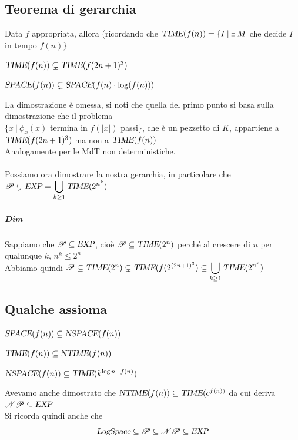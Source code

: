 \documentclass[10pt]{book}
\begin{document}
\subsection{Teorema di gerarchia}
Data $f$ appropriata, allora (ricordando che $\textsl{TIME}(f(n))=\{I\:|\:\exists\:M$ che decide $I$ in tempo $f(n)\}$
\begin{list}{}{}
	\item $\textsl{TIME}(f(n))\subsetneq\textsl{TIME}(f(2n + 1)^3)$
	\item $\textsl{SPACE}(f(n))\subsetneq\textsl{SPACE}(f(n)\cdot\log(f(n)))$
\end{list}
La dimostrazione è omessa, si noti che quella del primo punto si basa sulla dimostrazione che il problema\\$\{x\:|\:\phi_x(x)$ termina in $f(|x|)$ passi$\}$, che è un pezzetto di $K$, appartiene a $\textsl{TIME}(f(2n+1)^3)$ ma non a $\textsl{TIME}(f(n))$\\
Analogamente per le MdT non deterministiche.
\paragraph{} Possiamo ora dimostrare la nostra gerarchia, in particolare che $\mathscr{P} \subsetneq \textsl{EXP} = \mathlarger{\bigcup_{k \geq 1}\textsl{TIME}(2^{n^k})}$
\subparagraph{Dim} Sappiamo che $\mathscr{P} \subseteq \textsl{EXP}$, cioè $\mathscr{P} \subseteq \textsl{TIME}(2^n)$ perché al crescere di $n$ per qualunque $k$, $n^k \leq 2^n$\\
Abbiamo quindi $\mathscr{P} \subseteq \textsl{TIME}(2^n) \subsetneq\textsl{TIME}(f(2^{(2n + 1)^3}) \subseteq \mathlarger{\bigcup_{k \geq 1}\textsl{TIME}(2^{n^k})}$
\subsection{Qualche assioma}
\begin{list}{-}{}
	\item $\textsl{SPACE}(f(n))\subseteq\textsl{NSPACE}(f(n))$
	\item $\textsl{TIME}(f(n))\subseteq\textsl{NTIME}(f(n))$
	\item $\textsl{NSPACE}(f(n))\subseteq\textsl{TIME}(k^{\log n + f(n)})$
\end{list}
Avevamo anche dimostrato che $\textsl{NTIME}(f(n)) \subseteq \textsl{TIME}(c^{f(n))}$ da cui deriva $\mathscr{NP} \subseteq \textsl{EXP}$\\
Si ricorda quindi anche che
$$\textsl{LogSpace} \subseteq \mathscr{P} \subseteq \mathscr{NP} \subseteq \textsl{EXP}$$
\end{document}
